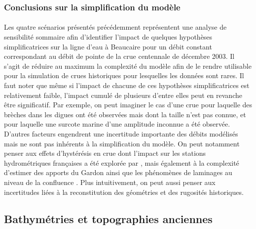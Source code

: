 	\subsubsection{Conclusions sur la simplification du modèle}
	
	\paragraph{} Les quatre scénarios présentés précédemment représentent une analyse de sensibilité sommaire afin d'identifier l'impact de quelques hypothèses simplificatrices sur la ligne d'eau à Beaucaire pour un débit constant correspondant au débit de pointe de la crue centennale de décembre 2003. Il s'agit de réduire au maximum la complexité du modèle afin de le rendre utilisable pour la simulation de crues historiques pour lesquelles les données sont rares. Il faut noter que même si l'impact de chacune de ces hypothèses simplificatrices est relativement faible, l'impact cumulé de plusieurs d'entre elles peut en revanche être significatif. Par exemple, on peut imaginer le cas d'une crue pour laquelle des brèches dans les digues ont été observées mais dont la taille n'est pas connue, et pour laquelle une surcote marine d'une amplitude inconnue a été observée. D'autres facteurs engendrent une incertitude importante des débits modélisés mais ne sont pas inhérents à la simplification du modèle. On peut notamment penser aux effets d'hystérésis en crue dont l'impact sur les stations hydrométriques françaises a été explorée par \cite{perret_framework_2022}, mais également à la complexité d'estimer des apports du Gardon ainsi que les phénomènes de laminages au niveau de la confluence \citep{symadrem_programme_2012}. Plus intuitivement, on peut aussi penser aux incertitudes liées à la reconstitution des géométries et des rugosités historiques.
	
	\subsection{Bathymétries et topographies anciennes}
	
